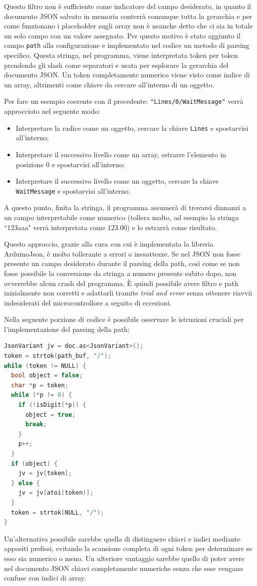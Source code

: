 \documentclass[12pt,a4paper]{report}
\begin{document}
Questo filtro non è sufficiente come indicatore del campo desiderato, in quanto il documento JSON salvato in memoria conterrà comunque
tutta la gerarchia e per come funzionano i placeholder sugli array non è neanche detto che ci sia in totale un solo campo con un valore
assegnato.
Per questo motivo è stato aggiunto il campo \texttt{path} alla configurazione e implementato nel codice un metodo di parsing specifico.
Questa stringa, nel programma, viene interpretata token per token prendendo gli slash come separatori e usata per esplorare
la gerarchia del documento JSON. Un token completamente numerico viene visto come indice di un array, altrimenti come chiave da
cercare all'interno di un oggetto.

Per fare un esempio coerente con il precedente: \texttt{"Lines/0/WaitMessage"} verrà approcciato nel seguente modo:
\begin{itemize}
  \item Interpretare la radice come un oggetto, cercare la chiave \texttt{Lines} e spostarvisi all'interno;
  \item Interpretare il successivo livello come un array, estrarre l'elemento in posizione 0 e spostarvisi all'interno;
  \item Interpretare il successivo livello come un oggetto, cercare la chiave \texttt{WaitMessage} e spostarvisi all'interno.
\end{itemize}
A questo punto, finita la stringa, il programma assumerà di trovarsi dinnanzi a un campo interpretabile come numerico (tollera molto,
ad esempio la stringa ``123aaa" verrà interpretata come 123.00) e lo estrarrà come risultato. %

Questo approccio, grazie alla cura con cui è implementata la libreria ArduinoJson, è molto tollerante a errori o inesattezze.
Se nel JSON non fosse presente un campo desiderato durante il parsing della path, così come se non fosse possibile la conversione
da stringa a numero presente subito dopo, non avverrebbe alcun crash del programma.
È quindi possibile avere filtro e path inizialmente non corretti e adattarli tramite \textit{trial and error} senza ottenere riavvii
indesiderati del microcontrollore a seguito di eccezioni.

Nella seguente porzione di codice è possibile osservare le istruzioni cruciali per l'implementazione del parsing della path:
\begin{lstlisting}[language=cpp]
JsonVariant jv = doc.as<JsonVariant>();
token = strtok(path_buf, "/");
while (token != NULL) {
  bool object = false;
  char *p = token;
  while (*p != 0) {
    if (!isDigit(*p)) {
      object = true;
      break;
    }
    p++;
  }
  if (object) {
    jv = jv[token];
  } else {
    jv = jv[atoi(token)];
  }
  token = strtok(NULL, "/");
}
\end{lstlisting}
Un'alternativa possibile sarebbe quella di distinguere chiavi e indici mediante appositi prefissi, evitando la scansione completa di ogni
token per determinare se esso sia numerico o meno. Un ulteriore vantaggio sarebbe quello di poter avere nel documento JSON
chiavi completamente numeriche senza che esse vengano confuse con indici di array.
\end{document}
